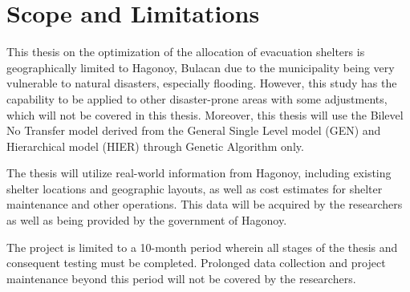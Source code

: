 \section{Scope and Limitations}

This thesis on the optimization of the allocation of evacuation shelters is geographically limited to Hagonoy, Bulacan due to the municipality being very vulnerable to natural disasters, especially flooding. However, this study has the capability to be applied to other disaster-prone areas with some adjustments, which will not be covered in this thesis. Moreover, this thesis will use the Bilevel No Transfer model derived from the General Single Level model (GEN) and Hierarchical model (HIER) through Genetic Algorithm only.

The thesis will utilize real-world information from Hagonoy, including existing shelter locations and geographic layouts, as well as cost estimates for shelter maintenance and other operations. This data will be acquired by the researchers as well as being provided by the government of Hagonoy.

The project is limited to a 10-month period wherein all stages of the thesis and consequent testing must be completed. Prolonged data collection and project maintenance beyond this period will not be covered by the researchers.

